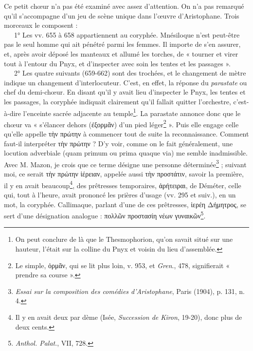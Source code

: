 \documentclass{book}%
\newcommand{\italique}[1]{\textit{#1}}%
\newcommand{\latin}[1]{{\policeLat #1}}%
\newcommand{\note}[1]{\footnote{#1}}
\begin{document}
Ce petit chœur n'a pas été examiné avec assez d'attention. On n'a pas remarqué qu'il s'accompagne d'un jeu de scène unique dans l'œuvre d'Aristophane. Trois morceaux le composent : \\
\ \ \ 1° Les vv. 655 à 658 appartiennent au coryphée. Mnésiloque n'est peut-être pas le seul homme qui ait pénétré parmi les femmes. Il importe de s'en assurer, et, après avoir déposé les manteaux et allumé les torches, de « tourner et virer tout à l'entour du Pnyx, et d'inspecter avec soin les tentes et les passages ».\\
\ \ \ 2° Les quatre suivants (659-662) sont des trochées, et le changement de mètre indique un changement d'interlocuteur. C'est, en effet, la réponse du \italique{parastate} ou chef du demi-chœur. En disant qu'il y avait lieu d'inspecter le Pnyx, les tentes et les passages, la coryphée indiquait clairement qu'il fallait quitter l'orchestre, c'est-à-dire l'enceinte sacrée adjacente au temple\note{On peut conclure de là que le Thesmophorion, qu'on savait situé sur une hauteur, l'était sur la colline du Pnyx et voisin du lieu d'assemblée.}. La parastate annonce donc que le chœur va « s'élancer dehors (ἐξορμᾶν) d'un pied léger\note{Le simple, ὀρμᾶν, qui se lit plus loin, v. 953, et \italique{Gren}., 478, signifierait « prendre sa course ».} ». Puis elle engage celle qu'elle appelle τὴν πρώτην à commencer tout de suite la reconnaissance. Comment faut-il interpréter τὴν πρώτην ? D'y voir, comme on le fait généralement, une locution adverbiale (\latin{quam primum} ou \latin{prima quaque via}) me semble inadmissible. Avec M. Mazon, je crois que ce terme désigne une personne déterminée\note{\italique{Essai sur la composition des comédies d'Aristophane}, Paris (1904), p. 131, n. 4.} ; suivant moi, ce serait τὴν πρώτην ἱέρειαν, appelée aussi τὴν προστάτιν, savoir la première, il y en avait beaucoup\note{Il y en avait deux par dème (Isée, \italique{Succession de Kiron}, 19-20), donc plus de deux cents.}, des prêtresses temporaires, ἀρήτειραι, de Déméter, celle qui, tout à l'heure, avait prononcé les prières d'usage (vv. 295 et suiv.), en un mot, la coryphée. 
Callimaque, parlant d'une de ces prêtresses, ἱερέη Δήμητρος, se sert d'une désignation analogue : πολλῶν προστασίη νέων γυναικῶν\note{\italique{Anthol. Palat}., VII, 728.}. \\
\end{document}
